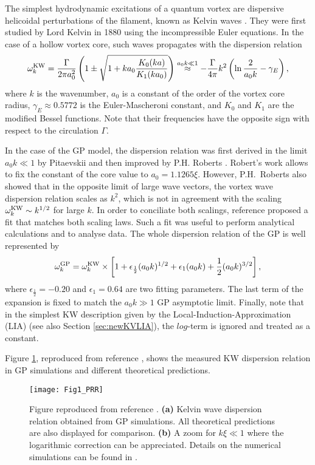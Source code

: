 \documentclass[sn-mathphys]{sn-jnl}%
\begin{document}
The simplest hydrodynamic excitations of a quantum vortex are dispersive helicoidal perturbations of the filament, known as Kelvin waves \cite{Pitaevskii61,Donnelly}. They were first studied by Lord Kelvin in 1880 \cite{Thomson_VibrationsColumnarVortex_1880} using the incompressible Euler equations. In the case of a hollow vortex core, such waves propagates with the dispersion relation
\begin{align}
    \label{kelvin}
    \omega_k^{\rm KW} = \frac{\Gamma}{2\pi a_0^2} \left(1 \pm
        \sqrt{1 + k a_0 \frac{K_0(ka)}{K_1(ka_0)}}\right) \stackrel{a_0k\ll1}{\approx}-\frac{\Gamma}{4\pi}k^2\left(\ln\frac{2}{a_0k}-\gamma_E\right),
\end{align}
where {$k$ is the wavenumber,} $a_0$ is a constant of the order of the vortex core radius, $\gamma_E\approx0.5772$ is the Euler-Mascheroni constant, and $K_0$ and $K_1$ are the modified Bessel functions. Note that their frequencies have the opposite sign with respect to the circulation $\Gamma$.

In the case of the GP model, the dispersion relation was first derived in the limit $a_0k\ll 1$ by Pitaevskii \cite{Pitaevskii61} and then improved by P.H. Roberts \cite{Roberts_VortexWavesCompressible_2003}. Robert's work allows to fix the constant of the core value to $a_0=1.1265\xi$. However, P.H.~Roberts also showed that in the opposite limit of large wave vectors, the vortex wave dispersion relation scales as $k^2$, which is not in agreement with the scaling $\omega_k^{\rm KW}\sim k^{1/2}$ for large $k$. In order to conciliate both scalings, reference \cite{Giuriato2020How} proposed a fit that matches both scaling laws. Such a fit was useful to perform analytical calculations and to analyse data. The whole dispersion relation of the GP is well represented by
\begin{align}
    \label{eq:omegaKWGP}
    \omega_k^{\rm GP} = \omega_k^{\rm KW}\times\left[1 + \epsilon_{\frac 12} (a_0 k)^{1/2}+\epsilon_{ 1} (a_0 k)+\frac 12 (a_0 k)^{3/2}   \right],
\end{align}
where $\epsilon_{\frac 12}=-0.20$ and $\epsilon_{1}=0.64$ are two fitting parameters. The last term of the expansion is fixed to match the $a_0k\gg1$ GP asymptotic limit. Finally, note that in the simplest KW description given by the Local-Induction-Approximation (LIA) \cite{DaRios_SulMotoLiquido_1906} (see also Section \ref{sec:newKVLIA}), the $log$-term is ignored and treated as a constant. 

Figure \ref{fig:KWdispRelation}, reproduced from reference \cite{Giuriato2020How}, shows the measured KW dispersion relation in GP simulations and different theoretical predictions.
\begin{figure}[h]%
    \centering
    \texttt{[image: Fig1\_PRR]}
    \caption{Figure reproduced from reference \cite{Giuriato2020How}. \textbf{(a)} Kelvin wave dispersion relation obtained from GP simulations. All theoretical predictions are also displayed for comparison. \textbf{(b)} A zoom for $k\xi\ll1$ where the logarithmic correction can be appreciated. {Details on the numerical simulations can be found in \cite{Giuriato2020How}.}}\label{fig:KWdispRelation}
\end{figure}
\end{document}
